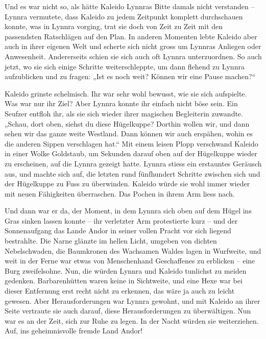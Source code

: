 \documentclass[10pt, a4paper, oneside]{book}
\begin{document}
Und es war nicht so, als hätte Kaleido Lynnras Bitte damals nicht verstanden – Lynnra vermutete, dass Kaleido zu jedem Zeitpunkt komplett durchschauen konnte, was in Lynnra vorging, trat sie doch von Zeit zu Zeit mit den passendsten Ratschlägen auf den Plan. In anderen Momenten lebte Kaleido aber auch in ihrer eigenen Welt und scherte sich nicht gross um Lynnras Anliegen oder Anwesenheit. Andererseits schien sie sich auch oft Lynnra unterzuordnen. So auch jetzt, wo sie sich einige Schritte weiterschleppte, um dann flehend zu Lynnra aufzublicken und zu fragen: „Ist es noch weit? Können wir eine Pause machen?“



Kaleido grinste schelmisch. Ihr war sehr wohl bewusst, wie sie sich aufspielte. Was war nur ihr Ziel? Aber Lynnra konnte ihr einfach nicht böse sein. Ein Seufzer entfloh ihr, als sie sich wieder ihrer magischen Begleiterin zuwandte. „Schau, dort oben, siehst du diese Hügelkuppe? Dorthin wollen wir, und dann sehen wir das ganze weite Westland. Dann können wir auch erspähen, wohin es die anderen Sippen verschlagen hat.“ Mit einem leisen Plopp verschwand Kaleido in einer Wolke Goldstaub, um Sekunden darauf oben auf der Hügelkuppe wieder zu erscheinen, auf die Lynnra gezeigt hatte. Lynnra stiess ein erstauntes Geräusch aus, und machte sich auf, die letzten rund fünfhundert Schritte zwischen sich und der Hügelkuppe zu Fuss zu überwinden. Kaleido würde sie wohl immer wieder mit neuen Fähigkeiten überraschen. Das Pochen in ihrem Arm liess nach.



Und dann war er da, der Moment, in dem Lynnra sich oben auf dem Hügel ins Gras sinken lassen konnte – ihr verletzter Arm protestierte kurz – und der Sonnenaufgang das Lande Andor in seiner vollen Pracht vor sich liegend bestrahlte. Die Narne glänzte im hellen Licht, umgeben von dichten Nebelschwaden, die Baumkronen des Wachsamen Waldes lagen in Wurfweite, und weit in der Ferne war etwas von Menschenhand Geschaffenes zu erblicken – eine Burg zweifelsohne. Nun, die würden Lynnra und Kaleido tunlichst zu meiden gedenken. Barbarenhütten waren keine in Sichtweite, und eine Hexe war bei dieser Entfernung erst recht nicht zu erkennen, das wäre ja auch zu leicht gewesen. Aber Herausforderungen war Lynnra gewohnt, und mit Kaleido an ihrer Seite vertraute sie auch darauf, diese Herausforderungen zu überwältigen. Nun war es an der Zeit, sich zur Ruhe zu legen. In der Nacht würden sie weiterziehen. Auf, ins geheimnisvolle fremde Land Andor!
\end{document}
